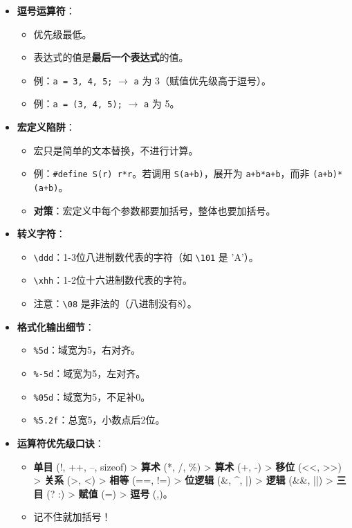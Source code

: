 \documentclass[a4paper,12pt]{article}
\begin{document}
\begin{itemize}
    \item \textbf{逗号运算符}：
    \begin{itemize}
        \item 优先级最低。
        \item 表达式的值是\textbf{最后一个表达式}的值。
        \item 例：\texttt{a = 3, 4, 5;} $\rightarrow$ \texttt{a} 为 3（赋值优先级高于逗号）。
        \item 例：\texttt{a = (3, 4, 5);} $\rightarrow$ \texttt{a} 为 5。
    \end{itemize}

    \item \textbf{宏定义陷阱}：
    \begin{itemize}
        \item 宏只是简单的文本替换，不进行计算。
        \item 例：\texttt{\#define S(r) r*r}。若调用 \texttt{S(a+b)}，展开为 \texttt{a+b*a+b}，而非 \texttt{(a+b)*(a+b)}。
        \item \textbf{对策}：宏定义中每个参数都要加括号，整体也要加括号。
    \end{itemize}

    \item \textbf{转义字符}：
    \begin{itemize}
        \item \texttt{\textbackslash ddd}：1-3位八进制数代表的字符（如 \texttt{\textbackslash 101} 是 'A'）。
        \item \texttt{\textbackslash xhh}：1-2位十六进制数代表的字符。
        \item 注意：\texttt{\textbackslash 08} 是非法的（八进制没有8）。
    \end{itemize}

    \item \textbf{格式化输出细节}：
    \begin{itemize}
        \item \texttt{\%5d}：域宽为5，右对齐。
        \item \texttt{\%-5d}：域宽为5，左对齐。
        \item \texttt{\%05d}：域宽为5，不足补0。
        \item \texttt{\%5.2f}：总宽5，小数点后2位。
    \end{itemize}

    \item \textbf{运算符优先级口诀}：
    \begin{itemize}
        \item \textbf{单目} (!, ++, --, sizeof) > \textbf{算术} (*, /, \%) > \textbf{算术} (+, -) > \textbf{移位} (<<, >>) > \textbf{关系} (>, <) > \textbf{相等} (==, !=) > \textbf{位逻辑} (\&, \^{}, |) > \textbf{逻辑} (\&\&, ||) > \textbf{三目} (? :) > \textbf{赋值} (=) > \textbf{逗号} (,)。
        \item 记不住就加括号！
    \end{itemize}
    

\end{itemize}
\end{document}
